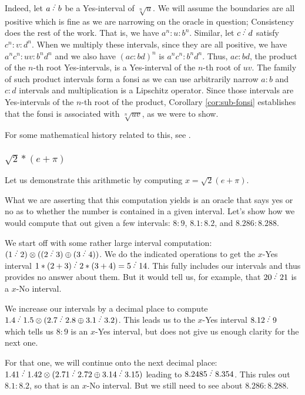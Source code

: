 \documentclass[12pt]{article}
\begin{document}
Indeed, let $a\lte b$ be a Yes-interval of $\sqrt[n]{u}$. We will assume the boundaries are all positive which is fine as we are narrowing on the oracle in question; Consistency does the rest of the work. That is, we have $a^n:u:b^n$.  Similar, let $c \lte d$ satisfy $c^n : v : d^n$. When we multiply these intervals, since they are all positive, we have $a^n c^n : uv : b^n d^n$ and we also have $(ac:bd)^n$ is $a^n c^n : b^n d^n$. Thus, $ac:bd$, the product of the $n$-th root Yes-intervals, is a Yes-interval of the $n$-th root of $uv$. The family of such product intervals form a fonsi as we can use arbitrarily narrow $a:b$ and $c:d$ intervals and multiplication is a Lipschitz operator. Since those intervals are Yes-intervals of the $n$-th root of the product, Corollary \ref{cor:sub-fonsi} establishes that the fonsi is associated with $\sqrt[n]{uv}$, as we were to show. 

For some mathematical history related to this, see \cite{fowler}.

\subsubsection{\texorpdfstring{$\sqrt{2}*(e + \pi)$}{2epi}}

Let us demonstrate this arithmetic by computing $x = \sqrt{2}(e + \pi)$. 

What we are asserting that this computation yields is an oracle that says yes or no as to whether the number is contained in a given interval. Let's show how we would compute that out given a few intervals:  $8:9$, $8.1:8.2$, and $8.286:8.288$.

We start off with some rather large interval computation: $(1 \lte 2) \otimes ( (2\lte  3) \oplus (3 \lte 4))$. We do the indicated operations to get the $x$-Yes interval $1*(2+3) \lte 2*(3+4) = 5 \lte 14$. This fully includes our intervals and thus provides no answer about them. But it would tell us, for example, that $20 \lte  21$ is a $x$-No interval. 

We increase our intervals by a decimal place to compute $1.4 \lte  1.5 \otimes ( 2.7\lte 2.8 \oplus 3.1 \lte 3.2)$. This leads us to the $x$-Yes interval $8.12 \lte 9$ which tells us $8:9$ is an $x$-Yes interval, but does not give us enough clarity for the next one. 

For that one, we will continue onto the next decimal place: $1.41 \lte 1.42 \otimes (2.71\lte 2.72 \oplus 3.14 \lte   3.15)$ leading to $8.2485 \lte  8.354$. This rules out $8.1:8.2$, so that is an $x$-No interval. But we still need to see about $8.286:8.288$.
\end{document}
